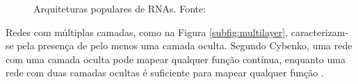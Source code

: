 \begin{figure}[h!]
     \hfill
     \hfill
     \caption{Arquiteturas populares de RNAs. Fonte: \cite{haykin}}
     \label{fig:architectures}
\end{figure}

Redes com múltiplas camadas, como na Figura \ref{subfig:multilayer}, caracterizam-se pela presença de pelo menos uma camada oculta. Segundo Cybenko, uma rede com uma camada oculta pode mapear qualquer função contínua, enquanto uma rede com duas camadas ocultas é suficiente para mapear qualquer função \cite{cybenko}.

